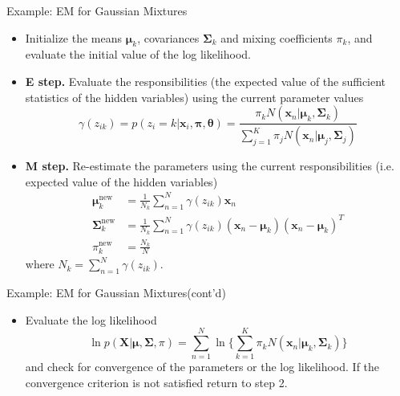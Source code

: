 \documentclass[10pt,mathserif]{beamer}
\begin{document}
\begin{frame}{Example: EM for Gaussian Mixtures}
\begin{itemize}
    \item Initialize the means $\bm{\mu}_k$, covariances $\bm{\Sigma}_k$ and mixing coefficients $\pi_k$, and evaluate the initial value of the log likelihood.
    \item \textbf{E step.} Evaluate the responsibilities (the expected value of the sufficient statistics of the hidden variables) using the current parameter values
        \begin{equation*}
            \gamma(z_{ik}) = p(z_i = k | \bm{x}_i, \bm{\pi}, \bm{\theta}) = \frac{\pi_k N(\bm{x}_n|\bm{\mu}_k,\bm{\Sigma}_k)}{\sum_{j=1}^K \pi_j N(\bm{x}_n|\bm{\mu}_j,\bm{\Sigma}_j) }
        \end{equation*}
    \item \textbf{M step.} Re-estimate the parameters using the current responsibilities (i.e. expected value of the hidden variables)
        \begin{equation*}
            \begin{split}
                \bm{\mu}_k^{\text{new}} & = \frac{1}{N_k}\sum_{n=1}^N\gamma(z_{ik})\bm{x}_n\\
                \bm{\Sigma}_k^{\text{new}} & = \frac{1}{N_k}\sum_{n=1}^N\gamma(z_{ik})(\bm{x}_n - \bm{\mu}_k)(\bm{x}_n - \bm{\mu}_k)^T\\
                \pi_k^{\text{new}} & = \frac{N_k}{N}
            \end{split}
        \end{equation*}
    where $N_k = \sum_{n=1}^N\gamma(z_{ik})$.
\end{itemize}
\end{frame}

\begin{frame}{Example: EM for Gaussian Mixtures(cont'd)}
\begin{itemize}
    \item Evaluate the log likelihood
        \begin{equation*}
            \ln p(\bm{X}|\bm{\mu},\bm{\Sigma},\pi) = \sum_{n=1}^N\ln\{\sum_{k=1}^K \pi_k N(\bm{x}_n|\bm{\mu}_k,\bm{\Sigma}_k)\}
        \end{equation*}
    and check for convergence of  the parameters or the log likelihood. If the convergence criterion is not satisfied return to step 2.
\end{itemize}
\end{frame}
\end{document}
